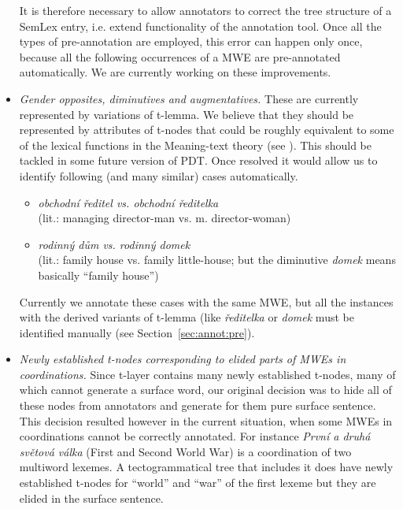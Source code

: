 \begin{itemize}
It is therefore necessary to allow annotators to correct the tree structure of a SemLex entry, i.e. extend functionality of the annotation tool. Once all the types of pre-annotation are employed, this error can happen only once, because all the following occurrences of a MWE are pre-annotated automatically. We are currently working on these improvements.
%
\item \emph{Gender opposites, diminutives and augmentatives.} These are currently represented by variations of t-lemma. 
We believe that they should be represented by attributes of t-nodes %
that could be roughly equivalent to some of the lexical functions in the Meaning-text theory (see \cite{melcuk:1992}).
This should be tackled in some future version of PDT. Once resolved it would allow us to identify following (and many similar) cases automatically. 
	\begin{itemize}
	\item \textit{obchodní ředitel {\rm vs.} obchodní ředitelka} \\(lit.: managing director-man vs. m. director-woman)
	\item \textit{rodinný dům {\rm vs.} rodinný domek} \\(lit.: family house vs. family little-house; but the diminutive \emph{domek} means basically “family house”)
	\end{itemize}
%
Currently we annotate these cases with the same MWE, but all the instances with the derived variants of t-lemma (like \emph{ředitelka } or \emph{domek} must be identified manually (see Section~\ref{sec:annot:pre}).%

%
\item \emph{Newly established t-nodes corresponding to elided parts of MWEs in coordinations.} Since t-layer contains many newly established t-nodes, many of which cannot generate a surface word, our original decision was to hide all of these nodes from annotators and generate for them pure surface sentence. This decision resulted however in the current situation, when some MWEs in coordinations cannot be correctly annotated. 
For instance \emph{První a druhá světová válka} (First and Second World War) is a coordination of two multiword lexemes. A tectogrammatical tree that includes it does have newly established t-nodes for “world” and “war” of the first lexeme but they are elided in the surface sentence. 
%


\end{itemize}
